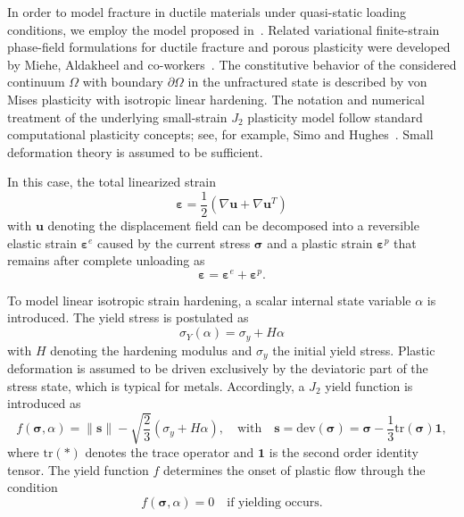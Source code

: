 \documentclass[pdflatex,sn-mathphys-num]{sn-jnl}%
\theoremstyle{thmstyleone}%
\theoremstyle{thmstyletwo}%
\theoremstyle{thmstylethree}%
\begin{document}
In order to model fracture in ductile materials under quasi-static loading conditions, we employ the model proposed in~\cite{noll_3d_2020}. 
Related variational finite-strain phase-field formulations for ductile fracture and porous plasticity were developed by Miehe, Aldakheel and co-workers~\cite{miehe_phasefield_ductile_2016,miehe_phasefield_porous_2016,miehe_phasefield_implementation_2017}.
The constitutive behavior of the considered continuum $\Omega$ with boundary $\partial\Omega$ in the unfractured state is described by von Mises plasticity with isotropic linear hardening. 
The notation and numerical treatment of the underlying small-strain $J_2$ plasticity model follow standard computational plasticity concepts; see, for example, Simo and Hughes~\cite{simo_computational_1998}.
Small deformation theory is assumed to be sufficient.

In this case, the total linearized strain
\begin{equation}
    \boldsymbol{\varepsilon} = \dfrac{1}{2}\left(\nabla{\boldsymbol{u}} + \nabla{\boldsymbol{u}}^T\right)
\end{equation}
with $\boldsymbol{u}$ denoting the displacement field can be decomposed into a reversible elastic strain $\boldsymbol{\varepsilon}^e$ caused by the current stress $\boldsymbol{\sigma}$ and a plastic strain $\boldsymbol{\varepsilon}^p$ that remains after complete unloading as
\begin{equation}
  \boldsymbol{\varepsilon} =  \boldsymbol{\varepsilon}^e + \boldsymbol{\varepsilon}^p.
\end{equation}

To model linear isotropic strain hardening, a scalar internal state variable $\alpha$ is introduced. 
The yield stress is postulated as
\begin{equation}
    \sigma_Y(\alpha) = \sigma_y + H\alpha
\end{equation}
with $H$ denoting the hardening modulus and $\sigma_y$ the initial yield stress. 
Plastic deformation is assumed to be driven exclusively by the deviatoric part of the stress state, which is typical for metals. 
Accordingly, a $J_2$ yield function is introduced as
\begin{equation}
    f(\boldsymbol{\sigma},\alpha) = \|\boldsymbol{s}\| - \sqrt{\dfrac{2}{3}}\left(\sigma_y+H\alpha\right), 
    \quad \text{with} \quad 
    \boldsymbol{s} = \text{dev}\left(\boldsymbol{\sigma}\right) = \boldsymbol{\sigma}-\dfrac{1}{3}\text{tr}\left(\boldsymbol{\sigma}\right)\boldsymbol{1},
\end{equation}
where $\text{tr}(*)$ denotes the trace operator and $\boldsymbol{1}$ is the second order identity tensor.
The yield function $f$ determines the onset of plastic flow through the condition
\begin{equation}
    f(\boldsymbol{\sigma},\alpha) = 0 \quad \text{if yielding occurs}.
\end{equation}
\end{document}
